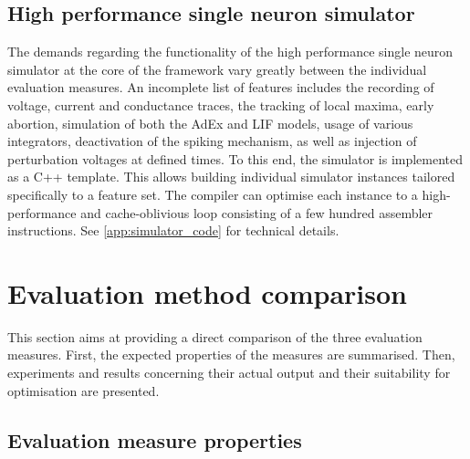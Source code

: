 \subsection{High performance single neuron simulator}
\label{sec:simulator}

The demands regarding the functionality of the high performance single neuron simulator at the core of the \AdExpSim framework vary greatly between the individual evaluation measures. An incomplete list of features includes the recording of voltage, current and conductance traces, the tracking of local maxima, early abortion, simulation of both the \acrshort{AdEx} and \acrshort{LIF} models, usage of various integrators, deactivation of the spiking mechanism, as well as injection of perturbation voltages at defined times. To this end, the simulator is implemented as a C++ template. This allows building individual simulator instances tailored specifically to a feature set. The compiler can optimise each instance to a high-performance and cache-oblivious loop consisting of a few hundred assembler instructions. See \cref{app:simulator_code} for technical details.

\pagebreak


\section{Evaluation method comparison}
\label{sec:single_neuron_measure_comparison}

This section aims at providing a direct comparison of the three evaluation measures. First, the expected properties of the measures are summarised. Then, experiments and results concerning their actual output and their suitability for optimisation are presented.

\subsection{Evaluation measure properties}
\label{sec:evaluation_measure_theoretical}

